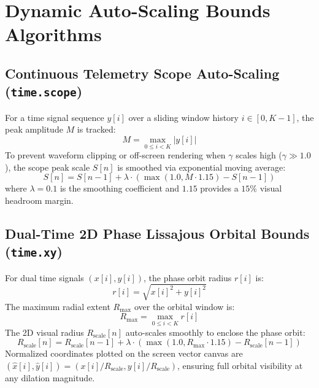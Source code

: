\documentclass[11pt,a4paper]{article}
\begin{document}
\section{Dynamic Auto-Scaling Bounds Algorithms}

\subsection{Continuous Telemetry Scope Auto-Scaling (\texttt{time.scope})}
For a time signal sequence $y[i]$ over a sliding window history $i \in [0, K-1]$, the peak amplitude $M$ is tracked:
\begin{equation}
M = \max_{0 \le i < K} |y[i]|
\end{equation}
To prevent waveform clipping or off-screen rendering when $\gamma$ scales high ($\gamma \gg 1.0$), the scope peak scale $S[n]$ is smoothed via exponential moving average:
\begin{equation}
S[n] = S[n-1] + \lambda \cdot \left(\max(1.0, M \cdot 1.15) - S[n-1]\right)
\end{equation}
where $\lambda = 0.1$ is the smoothing coefficient and $1.15$ provides a $15\%$ visual headroom margin.

\subsection{Dual-Time 2D Phase Lissajous Orbital Bounds (\texttt{time.xy})}
For dual time signals $(x[i], y[i])$, the phase orbit radius $r[i]$ is:
\begin{equation}
r[i] = \sqrt{x[i]^2 + y[i]^2}
\end{equation}
The maximum radial extent $R_{\text{max}}$ over the orbital window is:
\begin{equation}
R_{\text{max}} = \max_{0 \le i < K} r[i]
\end{equation}
The 2D visual radius $R_{\text{scale}}[n]$ auto-scales smoothly to enclose the phase orbit:
\begin{equation}
R_{\text{scale}}[n] = R_{\text{scale}}[n-1] + \lambda \cdot \left(\max(1.0, R_{\text{max}} \cdot 1.15) - R_{\text{scale}}[n-1]\right)
\end{equation}
Normalized coordinates plotted on the screen vector canvas are $(\hat{x}[i], \hat{y}[i]) = (x[i] / R_{\text{scale}}, y[i] / R_{\text{scale}})$, ensuring full orbital visibility at any dilation magnitude.
\end{document}
